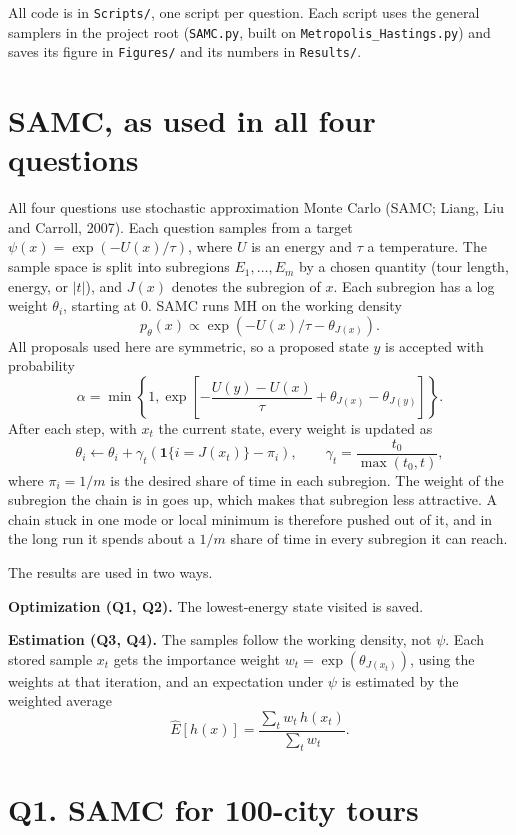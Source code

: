 \documentclass[11pt]{article}
\begin{document}
All code is in \texttt{Scripts/}, one script per question. Each script uses the general samplers in the
project root (\texttt{SAMC.py}, built on \texttt{Metropolis\_Hastings.py}) and saves its figure in
\texttt{Figures/} and its numbers in \texttt{Results/}.

\section*{SAMC, as used in all four questions}

All four questions use stochastic approximation Monte Carlo (SAMC; Liang, Liu and Carroll, 2007). Each
question samples from a target $\psi(x) = \exp(-U(x)/\tau)$, where $U$ is an energy and $\tau$ a
temperature. The sample space is split into subregions $E_1, \ldots, E_m$ by a chosen quantity (tour length,
energy, or $|t|$), and $J(x)$ denotes the subregion of $x$. Each subregion has a log weight $\theta_i$, starting
at 0. SAMC runs MH on the working density
\[
p_\theta(x) \propto \exp\left(-U(x)/\tau - \theta_{J(x)}\right).
\]
All proposals used here are symmetric, so a proposed state $y$ is accepted with probability
\[
\alpha = \min\left\{1, \exp\left[-\frac{U(y) - U(x)}{\tau} + \theta_{J(x)} - \theta_{J(y)}\right]\right\}.
\]
After each step, with $x_t$ the current state, every weight is updated as
\[
\theta_i \leftarrow \theta_i + \gamma_t \left( \mathbf{1}\{i = J(x_t)\} - \pi_i \right), \qquad
\gamma_t = \frac{t_0}{\max(t_0, t)},
\]
where $\pi_i = 1/m$ is the desired share of time in each subregion. The weight of the subregion the chain is in
goes up, which makes that subregion less attractive. A chain stuck in one mode or local minimum is therefore
pushed out of it, and in the long run it spends about a $1/m$ share of time in every subregion it can reach.

The results are used in two ways.

\textbf{Optimization (Q1, Q2).} The lowest-energy state visited is saved.

\textbf{Estimation (Q3, Q4).} The samples follow the working density, not $\psi$. Each stored sample $x_t$ gets
the importance weight $w_t = \exp(\theta_{J(x_t)})$, using the weights at that iteration, and an expectation
under $\psi$ is estimated by the weighted average
\[
\widehat{E}[h(x)] = \frac{\sum_t w_t\, h(x_t)}{\sum_t w_t}.
\]

\newpage
\section*{Q1. SAMC for 100-city tours}
\end{document}
